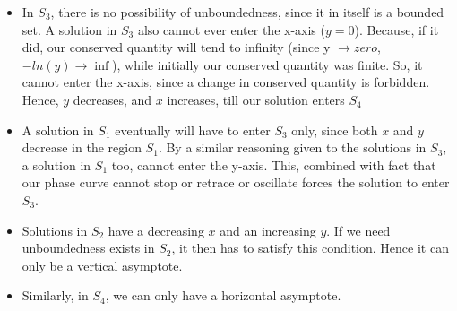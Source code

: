 \documentclass{article}
\begin{document}
\begin{itemize}
    \item In $S_3$, there is no possibility of unboundedness, since it in itself is a bounded set. A solution in $S_3$ also cannot ever enter the x-axis ($y=0$). Because, if it did, our conserved quantity will tend to infinity (since y $\to zero$, $-ln(y) \to \inf$), while initially our conserved quantity was finite. So, it cannot enter the x-axis, since a change in conserved quantity is forbidden. Hence, $y$ decreases, and $x$ increases, till our solution enters $S_4$
    \item A solution in $S_1$ eventually will have to enter $S_3$ only, since both $x$ and $y$ decrease in the region $S_1$. By a similar reasoning given to the solutions in $S_3$, a solution in $S_1$ too, cannot enter the y-axis. This, combined with fact that our phase curve cannot stop or retrace or oscillate forces the solution to enter $S_3$. 
    \item Solutions in $S_2$ have a decreasing $x$ and an increasing $y$. If we need unboundedness exists in $S_2$, it then has to satisfy this condition. Hence it can only be a vertical asymptote. 
    \item Similarly, in $S_4$, we can only have a horizontal asymptote.
\end{itemize}
\end{document}
